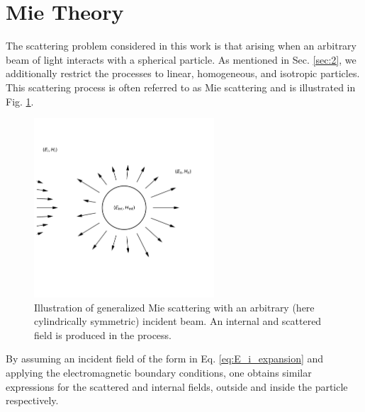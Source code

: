 \section{Mie Theory}

The scattering problem considered in this work is that arising when an arbitrary beam of light interacts with a spherical particle. As mentioned in Sec. \ref{sec:2}, we additionally restrict the processes to linear, homogeneous, and isotropic particles. This scattering process is often referred to as Mie scattering and is illustrated in Fig. \ref{fig:glmt}.

\begin{figure}
    \includegraphics[trim={0 1cm 0 1cm},clip,width=0.6\textwidth]{Figures/figure.png}
    \caption{Illustration of generalized Mie scattering with an arbitrary (here cylindrically symmetric) incident beam. An internal and scattered field is produced in the process.}
    \label{fig:glmt}
\end{figure}

By assuming an incident field of the form in Eq. \ref{eq:E_i_expansion} and applying the electromagnetic boundary conditions, one obtains similar expressions for the scattered and internal fields, outside and inside the particle respectively.

